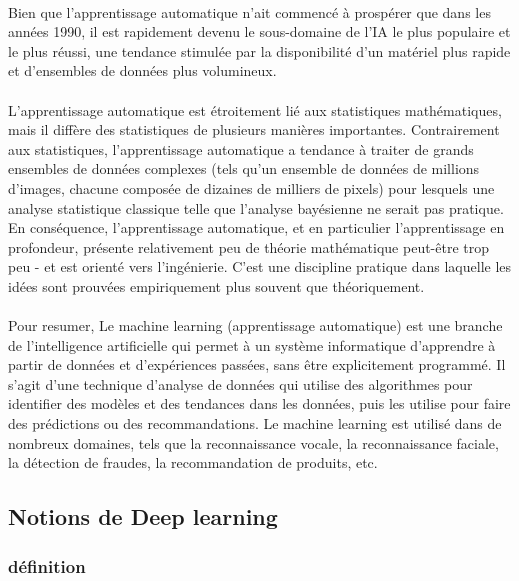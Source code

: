 \paragraph{}Bien que l'apprentissage automatique n'ait commencé à prospérer que dans les années 1990, il est rapidement devenu le sous-domaine de l'IA le plus populaire et le plus réussi, une tendance stimulée par la disponibilité d'un matériel plus rapide et d'ensembles de données plus volumineux. 
\paragraph{}L'apprentissage automatique est étroitement lié aux statistiques mathématiques, mais il diffère des statistiques de plusieurs manières importantes. Contrairement aux statistiques, l'apprentissage automatique a tendance à traiter de grands ensembles de données complexes (tels qu'un ensemble de données de millions d'images, chacune composée de dizaines de milliers de pixels) pour lesquels une analyse statistique classique telle que l'analyse bayésienne ne serait pas pratique. En conséquence, l'apprentissage automatique, et en particulier l'apprentissage en profondeur, présente relativement peu de théorie mathématique peut-être trop peu - et est orienté vers l'ingénierie. C'est une discipline pratique dans laquelle les idées sont prouvées empiriquement plus souvent que théoriquement.
\paragraph{}Pour resumer, Le machine learning (apprentissage automatique) est une branche de l'intelligence artificielle qui permet à un système informatique d'apprendre à partir de données et d'expériences passées, sans être explicitement programmé. Il s'agit d'une technique d'analyse de données qui utilise des algorithmes pour identifier des modèles et des tendances dans les données, puis les utilise pour faire des prédictions ou des recommandations. Le machine learning est utilisé dans de nombreux domaines, tels que la reconnaissance vocale, la reconnaissance faciale, la détection de fraudes, la recommandation de produits, etc.

\subsection{Notions de Deep learning}
\subsubsection{définition}

